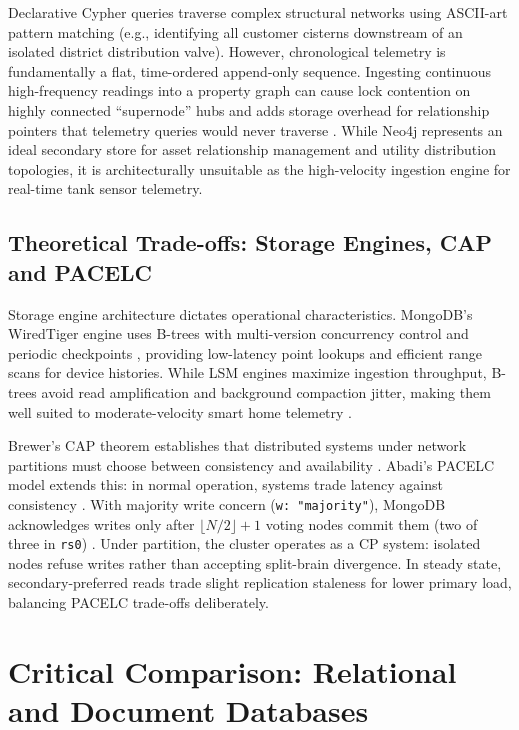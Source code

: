 \documentclass[11pt,a4paper]{article}
\begin{document}
Declarative Cypher queries traverse complex structural networks using ASCII-art pattern matching (e.g., identifying all customer cisterns downstream of an isolated district distribution valve). However, chronological telemetry is fundamentally a flat, time-ordered append-only sequence. Ingesting continuous high-frequency readings into a property graph can cause lock contention on highly connected ``supernode'' hubs and adds storage overhead for relationship pointers that telemetry queries would never traverse \citep{robinson2015}. While Neo4j represents an ideal secondary store for asset relationship management and utility distribution topologies, it is architecturally unsuitable as the high-velocity ingestion engine for real-time tank sensor telemetry.

\subsection{Theoretical Trade-offs: Storage Engines, CAP and PACELC}
Storage engine architecture dictates operational characteristics. MongoDB's WiredTiger engine uses B-trees with multi-version concurrency control and periodic checkpoints \citep{mongoWT}, providing low-latency point lookups and efficient range scans for device histories. While LSM engines maximize ingestion throughput, B-trees avoid read amplification and background compaction jitter, making them well suited to moderate-velocity smart home telemetry \citep{kleppmann2017}.

Brewer's CAP theorem establishes that distributed systems under network partitions must choose between consistency and availability \citep{gilbert2002,brewer2012}. Abadi's PACELC model extends this: in normal operation, systems trade latency against consistency \citep{abadi2012}. With majority write concern (\texttt{w:~"majority"}), MongoDB acknowledges writes only after $\lfloor N/2 \rfloor + 1$ voting nodes commit them (two of three in \texttt{rs0}) \citep{mongoWC}. Under partition, the cluster operates as a CP system: isolated nodes refuse writes rather than accepting split-brain divergence. In steady state, secondary-preferred reads trade slight replication staleness for lower primary load, balancing PACELC trade-offs deliberately.

\FloatBarrier
\section{Critical Comparison: Relational and Document Databases}
\end{document}
